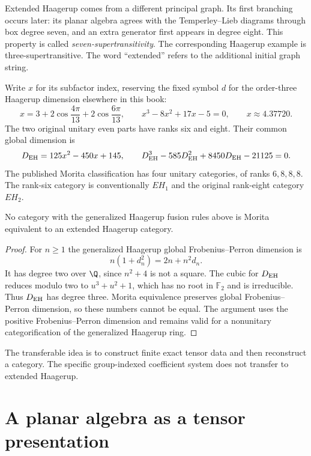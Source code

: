 Extended Haagerup comes from a different principal graph. Its
first branching occurs later: its planar algebra agrees with the
Temperley--Lieb diagrams through box degree seven, and an extra
generator first appears in degree eight. This property is called
\emph{seven-supertransitivity}. The corresponding Haagerup
example is three-supertransitive. The word ``extended'' refers
to the additional initial graph string.

Write $x$ for its subfactor index, reserving the fixed symbol
$d$ for the order-three Haagerup dimension elsewhere in this book:
\begin{equation}
 x=3+2\cos\frac{4\pi}{13}+2\cos\frac{6\pi}{13},\qquad
 x^3-8x^2+17x-5=0,
 \qquad x\approx4.37720.
 \label{eq:EH-index}
\end{equation}
The two original unitary even parts have ranks six and eight.
Their common global dimension is
\begin{equation}
 D_{\rm EH}=125x^2-450x+145,\qquad
 D_{\rm EH}^3-585D_{\rm EH}^2+8450D_{\rm EH}-21125=0.
 \label{eq:EH-global}
\end{equation}
The published Morita classification has four unitary categories,
of ranks $6,8,8,8$. The rank-six category is conventionally
$EH_1$ and the original rank-eight category $EH_2$.

\begin{proposition}
No category with the generalized Haagerup fusion rules above is
Morita equivalent to an extended Haagerup category.
\end{proposition}
\begin{proof}
For $n\geq1$ the generalized Haagerup global Frobenius--Perron
dimension is
\[
 n(1+d_n^2)=2n+n^2d_n.
\]
It has degree two over $\Q$, since $n^2+4$ is not a square.
The cubic for $D_{\rm EH}$ reduces modulo two to
$u^3+u^2+1$, which has no root in $\mathbb F_2$ and is
irreducible. Thus $D_{\rm EH}$ has degree three. Morita
equivalence preserves global Frobenius--Perron dimension, so
these numbers cannot be equal. The argument uses the positive
Frobenius--Perron dimension and remains valid for a nonunitary
categorification of the generalized Haagerup ring.
\end{proof}

The transferable idea is to construct finite exact tensor data and
then reconstruct a category. The specific group-indexed coefficient
system does not transfer to extended Haagerup.

\section{A planar algebra as a tensor presentation}

